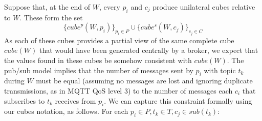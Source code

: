 \documentclass[chi_draft]{sigchi}
\begin{document}
Suppose that, at the end of $W$, every $p_i$ and $c_j$ produce  unilateral cubes relative to $W$. 
These form the set
\begin{equation}\label{eq:all-cubes}
\{ \mathit{cube}^p(W, p_i) \}_{p_i \in P}\cup \{\mathit{cube^s}(W, c_j) \}_{c_j \in C} 
\end{equation}
As each of these cubes provides a partial view of the same complete cube $ \mathit{cube}(W) $ that would have been generated centrally by a broker, we expect that the values found in these cubes be somehow consistent with $ \mathit{cube}(W) $.
%
The pub/sub model implies that the number of messages sent by $p_i$ with topic $t_k$ during $W$ must be equal (assuming no messages are lost and ignoring duplicate transmissions, as in MQTT QoS level 3) to the number of messages each $c_i$ that subscribes to $t_k$ receives from $p_i$. 
We can capture this constraint formally using our cubes notation, as follows.
%
For each $ p_i \in P, t_k \in T, c_j \in \mathit{sub}(t_k)$:
\end{document}
